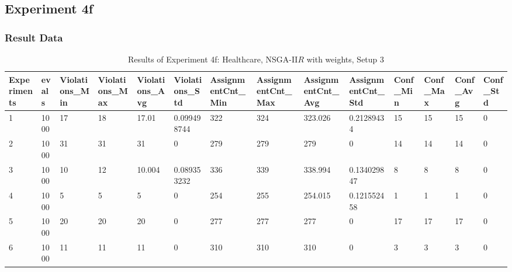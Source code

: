 	\subsection{Experiment 4f}
	\label{sec:A_Exp4f}
	\subsubsection{Result Data}
	\label{sec:A_Exp4f_Data}	
			\begin{table}[H]
				\caption{Results of Experiment 4f: Healthcare, NSGA-II$R$ with weights, Setup 3}
				\label{tab:A_Exp4f_Data}
				\begin{adjustbox}{max width=480pt,keepaspectratio,angle=90}
				\begin{tabular}{|l|l|l|l|l|l|l|l|l|l|l|l|l|l|}
					\hline
					\rowcolor[HTML]{EFEFEF} 
					Experiments & evals & Violations\_Min & Violations\_Max & Violations\_Avg & Violations\_Std & AssignmentCnt\_Min & AssignmentCnt\_Max & AssignmentCnt\_Avg & AssignmentCnt\_Std & Conf\_Min & Conf\_Max & Conf\_Avg & Conf\_Std   \\ \hline
					1           & 1000  & 17              & 18              & 17.01           & 0.099498744     & 322                & 324                & 323.026            & 0.21289434         & 15        & 15        & 15        & 0           \\ \hline
					2           & 1000  & 31              & 31              & 31              & 0               & 279                & 279                & 279                & 0                  & 14        & 14        & 14        & 0           \\ \hline
					3           & 1000  & 10              & 12              & 10.004          & 0.089353232     & 336                & 339                & 338.994            & 0.134029847        & 8         & 8         & 8         & 0           \\ \hline
					4           & 1000  & 5               & 5               & 5               & 0               & 254                & 255                & 254.015            & 0.121552458        & 1         & 1         & 1         & 0           \\ \hline
					5           & 1000  & 20              & 20              & 20              & 0               & 277                & 277                & 277                & 0                  & 17        & 17        & 17        & 0           \\ \hline
					6           & 1000  & 11              & 11              & 11              & 0               & 310                & 310                & 310                & 0                  & 3         & 3         & 3         & 0           \\ \hline

\end{tabular}
\end{adjustbox}
\end{table}
